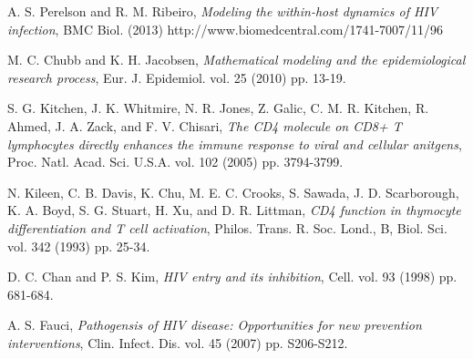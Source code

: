 \documentclass[11pt, oneside]{article}    %
\begin{document}
\begin{thebibliography}{99}
A. S. Perelson and  R. M. Ribeiro, {\em Modeling the within-host dynamics of HIV infection}, BMC Biol. (2013) http://www.biomedcentral.com/1741-7007/11/96

M. C. Chubb and K. H. Jacobsen,  {\em Mathematical modeling and the epidemiological research process}, Eur. J. Epidemiol. vol. 25 (2010) pp. 13-19.

S. G. Kitchen, J. K. Whitmire, N. R. Jones, Z. Galic, C. M. R. Kitchen, R. Ahmed, J. A. Zack, and F. V. Chisari,  {\em The CD4 molecule on CD8+ T lymphocytes directly enhances the immune response to viral and cellular anitgens}, Proc. Natl. Acad. Sci. U.S.A. vol. 102 (2005) pp. 3794-3799.

N. Kileen, C. B. Davis, K. Chu, M. E. C. Crooks, S. Sawada, J. D. Scarborough, K. A. Boyd, S. G. Stuart, H. Xu, and D. R. Littman, {\em CD4 function in thymocyte differentiation and T cell activation}, Philos. Trans. R. Soc. Lond., B, Biol. Sci. vol. 342 (1993) pp. 25-34.

D. C. Chan and P. S. Kim, {\em HIV entry and its inhibition}, Cell. vol. 93 (1998) pp. 681-684.

A. S. Fauci, {\em Pathogensis of HIV disease: Opportunities for new prevention interventions}, Clin. Infect. Dis. vol. 45 (2007) pp. S206-S212.


\end{thebibliography}
\end{document}

